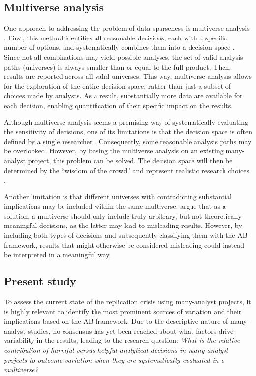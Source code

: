 \documentclass{article}
\begin{document}
\subsection*{Multiverse analysis}
One approach to addressing the problem of data sparseness is multiverse analysis \citep[e.g.,][]{steegen_increasing_2016, hoogeveen_many-analysts_2023-1}. First, this method identifies all reasonable decisions, each with a specific number of options, and systematically combines them into a decision space \citep{liu_approximation_2023}. Since not all combinations may yield possible analyses, the set of valid analysis paths (universes) is always smaller than or equal to the full product. Then, results are reported across all valid universes. This way, multiverse analysis allows for the exploration of the entire decision space, rather than just a subset of choices made by analysts. As a result, substantially more data are available for each decision, enabling quantification of their specific impact on the results.

Although multiverse analysis seems a promising way of systematically evaluating the sensitivity of decisions, one of its limitations is that the decision space is often defined by a single researcher \citep{simonsohn_specification_2015}. Consequently, some reasonable analysis paths may be overlooked. However, by basing the multiverse analysis on an existing many-analyst project, this problem can be solved. The decision space will then be determined by the ``wisdom of the crowd” and represent realistic research choices \citep{auspurg_toward_2024}. 

Another limitation is that different universes with contradicting substantial implications may be included within the same multiverse. \citet{del_giudice_travelers_2021} argue that as a solution, a multiverse should only include truly arbitrary, but not theoretically meaningful decisions, as the latter may lead to misleading results. However, by including both types of decisions and subsequently classifying them with the AB-framework, results that might otherwise be considered misleading could instead be interpreted in a meaningful way.

\subsection*{Present study}
To assess the current state of the replication crisis using many-analyst projects, it is highly relevant to identify the most prominent sources of variation and their implications based on the AB-framework. Due to the descriptive nature of many-analyst studies, no consensus has yet been reached about what factors drive variability in the results, leading to the research question: \emph{What is the relative contribution of harmful versus helpful analytical decisions in many-analyst projects to outcome variation when they are systematically evaluated in a multiverse?}
\end{document}
